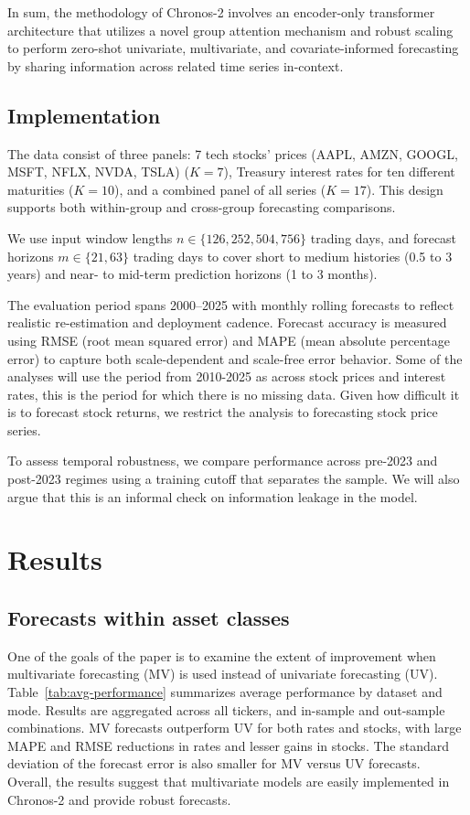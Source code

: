 \documentclass[twocolumn]{article}
\begin{document}
In sum, the methodology of Chronos-2 involves an encoder-only transformer architecture that utilizes a novel group attention mechanism and robust scaling to perform zero-shot univariate, multivariate, and covariate-informed forecasting by sharing information across related time series in-context.

\subsection{Implementation}

The data consist of three panels: 7 tech stocks' prices  (AAPL, AMZN, GOOGL, MSFT, NFLX, NVDA, TSLA) ($K=7$), Treasury interest rates for ten different maturities ($K=10$), and a combined panel of all series ($K=17$). This design supports both within-group and cross-group forecasting comparisons.

We use input window lengths $n \in \{126, 252, 504, 756\}$ trading days, and forecast horizons $m \in \{21, 63\}$ trading days to cover short to medium histories (0.5 to 3 years) and near- to mid-term prediction horizons (1 to 3 months).

The evaluation period spans 2000--2025 with monthly rolling forecasts to reflect realistic re-estimation and deployment cadence. Forecast accuracy is measured using RMSE (root mean squared error) and MAPE (mean absolute percentage error) to capture both scale-dependent and scale-free error behavior. Some of the analyses will use the period from 2010-2025 as across stock prices and interest rates, this is the period for which there is no missing data. Given how difficult it is to forecast stock returns, we restrict the analysis to forecasting stock price series. 

To assess temporal robustness, we compare performance across pre-2023 and post-2023 regimes using a training cutoff that separates the sample. We will also argue that this is an informal check on information leakage in the model. 

\section{Results}

\subsection{Forecasts within asset classes}

One of the goals of the paper is to examine the extent of improvement when multivariate forecasting (MV) is used instead of univariate forecasting (UV). Table~\ref{tab:avg-performance} summarizes average performance by dataset and mode. Results are aggregated across all tickers, and in-sample and out-sample combinations. MV forecasts outperform UV for both rates and stocks, with large MAPE and RMSE reductions in rates and lesser gains in stocks. The standard deviation of the forecast error is also smaller for MV versus UV forecasts. Overall, the results suggest that multivariate models are easily implemented in Chronos-2 and provide robust forecasts. 
\end{document}
